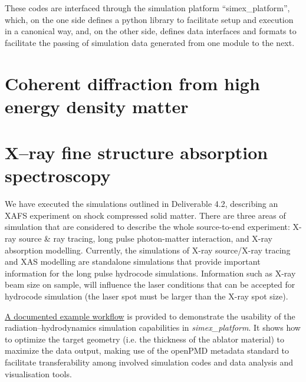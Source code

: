 \documentclass[12pt]{scrartcl}
\begin{document}
These codes are interfaced through the simulation platform ``simex\_platform'', which,
on the one side defines a python library to facilitate setup
and execution in a canonical way, and, on the other side, defines data interfaces
and formats to facilitate the passing of simulation data generated from one
module to the next.

\section{Coherent diffraction from high energy density matter}\label{sec:plasma_diffraction}


\section{X--ray fine structure absorption spectroscopy\label{sec:xafs}}
%
We have executed the simulations outlined in Deliverable
4.2\cite{EUCALL_SIMEX_D4.2}, describing an XAFS experiment on shock compressed
solid matter. There are three areas of simulation that are considered to describe the
whole source-to-end experiment: X-ray source \& ray tracing, long pulse photon-matter
interaction, and X-ray absorption modelling. Currently, the simulations of X-ray
source/X-ray tracing and XAS modelling are standalone simulations that provide
important information for the long pulse hydrocode simulations. Information
such as X-ray beam size on sample, will influence the laser conditions that can
be accepted for hydrocode simulation (the laser spot must be larger than the
X-ray spot size).



\href{https://www.github.com/eucall-software/simex_platform/wiki/Esther-Hydrocode-Tutorial}{A
documented example workflow} is provided to demonstrate the usability of the
radiation--hydrodynamics simulation capabilities in \textit{simex\_platform}. It
shows how to optimize the target geometry (i.e. the thickness of the ablator
material) to maximize the data output, making use of the openPMD metadata
standard to facilitate transferability among involved simulation codes and
data analysis and visualisation tools.
%
\end{document}
